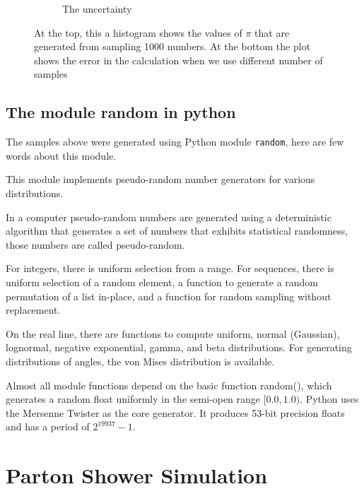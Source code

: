 \begin{figure}
\begin{subfigure}[b]{0.5\textwidth}
        \caption{The uncertainty}
        \label{fig:tiger}
    \end{subfigure}
    \label{Fig:1}
\caption{At the top, this a histogram shows the values of $\pi$ that are generated from sampling 1000 numbers. At the bottom the plot shows the error in the calculation when we use different number of samples} 
\label{fig:1.1}
\end{figure}



\subsection{The module random in python}

The samples above were generated using Python module \verb+random+, here are few words about this module.

 
This module implements pseudo-random number generators for various distributions.

In a computer pseudo-random numbers are generated using a deterministic algorithm that generates a set of numbers that exhibits statistical randomness, those numbers are called pseudo-random.

For integers, there is uniform selection from a range. For sequences, there is uniform selection of a random element, a function to generate a random permutation of a list in-place, and a function for random sampling without replacement.

On the real line, there are functions to compute uniform, normal (Gaussian), lognormal, negative exponential, gamma, and beta distributions. For generating distributions of angles, the von Mises distribution is available.

Almost all module functions depend on the basic function random(), which generates a random float uniformly in the semi-open range $[0.0, 1.0)$. Python uses the Mersenne Twister as the core generator. It produces 53-bit precision floats and has a period of $2^{19937}-1$\citep{python}.


\section{Parton Shower Simulation}

